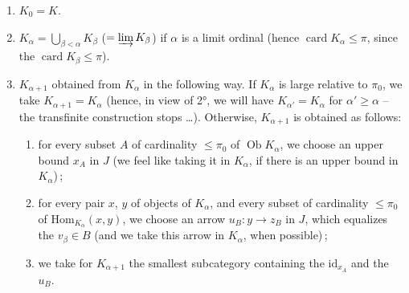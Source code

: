 \documentclass[11pt]{article}
\newcommand{\msp}[1]{\marginpar{\footnotesize [#1]}}
\newcommand{\card}{\operatorname{card}}
\newcommand{\Ob}{\operatorname{Ob}}
\begin{document}
\msp{page 169}
\begin{enumerate}
\item[1°)] $K_0 = K$.
\item[2°)] $K_{\alpha} = \bigcup_{\beta < \alpha} K_{\beta}$ ($= \varinjlim K_{\beta}$) if $\alpha$ is a limit ordinal (hence $\card K_{\alpha} \leqslant \pi$, since the $\card K_{\beta} \leqslant \pi$).
\item[3°)] $K_{\alpha+1}$ obtained from $K_{\alpha}$ in the following way. If $K_{\alpha}$ is large relative to $\pi_0$, we take $K_{\alpha+1} = K_{\alpha}$ (hence, in view of 2°, we will have $K_{\alpha'} = K_{\alpha}$ for $\alpha' \geqslant \alpha$ -- the transfinite construction stops \ldots). Otherwise, $K_{\alpha+1}$ is obtained as follows:
\begin{enumerate}
\item[a)] for every subset $A$ of cardinality $\leqslant \pi_0$ of $\Ob K_{\alpha}$, we choose an upper bound $x_A$ in $J$ (we feel like taking it in $K_{\alpha}$, if there is an upper bound in $K_{\alpha}$)\,;
\item[b)] for every pair $x$, $y$ of objects of $K_{\alpha}$, and every subset of cardinality $\leqslant \pi_0$ of $\mathrm{Hom}_{K_{\alpha}}(x,y)$, we choose an arrow $u_B : y \longrightarrow z_B$ in $J$, which equalizes the $v_{\beta} \in B$ (and we take this arrow in $K_{\alpha}$, when possible)\,;
\item[c)] we take for $K_{\alpha+1}$ the smallest subcategory containing the $\mathrm{id}_{x_A}$ and the $u_B$.
\end{enumerate}
\end{enumerate}
\end{document}
